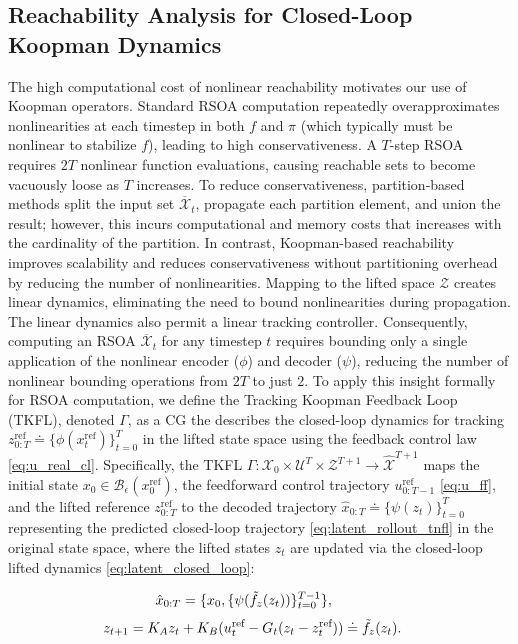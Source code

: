 \documentclass{l4dc2026}
\begin{document}
\subsection{Reachability Analysis for Closed-Loop Koopman Dynamics}\label{sec:reachability}
The high computational cost of nonlinear reachability motivates our use of Koopman operators. Standard RSOA computation repeatedly overapproximates nonlinearities at each timestep in both $f$ and $\pi$ (which typically must be nonlinear to stabilize $f$), leading to high conservativeness. A $T$-step RSOA requires $2T$ nonlinear function evaluations, causing reachable sets to become vacuously loose as $T$ increases. To reduce conservativeness, partition-based methods split the input set $\overline{\mathcal{X}}_t$, propagate each partition element, and union the result; however, this incurs computational and memory costs that increases with the cardinality of the partition. In contrast, Koopman-based reachability improves scalability and reduces conservativeness without partitioning overhead by reducing the number of nonlinearities. Mapping to the lifted space $\mathcal{Z}$ creates linear dynamics, eliminating the need to bound nonlinearities during propagation. The linear dynamics also permit a linear tracking controller. Consequently, computing an RSOA $\overline{\mathcal{X}}_t$ for any timestep $t$ requires bounding only a single application of the nonlinear encoder ($\phi$) and decoder ($\psi$), reducing the number of nonlinear bounding operations from $2T$ to just $2$. 
To apply this insight formally for RSOA computation, we define the Tracking Koopman Feedback Loop (TKFL), denoted $\Gamma$, as a CG the describes the closed-loop dynamics for tracking $z_{0:T}^{\text{ref}} \doteq \{\phi(x_t^{\text{ref}})\}_{t=0}^T$ in the lifted state space using the feedback control law \eqref{eq:u_real_cl}.  Specifically, the TKFL $\Gamma : \mathcal{X}_0 \times \mathcal{U}^T \times \mathcal{Z}^{T+1} \rightarrow \hat{\mathcal{X}}^{T+1}$ maps the initial state $x_0 \in \mathcal{B}_{\epsilon}(x_{0}^{\text{ref}})$, the feedforward control trajectory $u_{0:T-1}^{\text{ref}}$ \eqref{eq:u_ff}, and the lifted reference $z_{0:T}^{\text{ref}}$ to the decoded trajectory $\hat{x}_{0:T} \doteq \{\psi(z_{t})\}_{t=0}^T$ representing the predicted closed-loop trajectory \eqref{eq:latent_rollout_tnfl} in the original state space, where the lifted states $z_t$ are updated via the closed-loop lifted dynamics \eqref{eq:latent_closed_loop}: 

\begin{equation}
\label{eq:latent_rollout_tnfl}
    \hspace{-23pt}\hat{x}_{0:T} = \{x_0, \{\psi (\tilde f_z(z_t))\}_{t=0}^{T-1}\},
\end{equation}
\begin{equation}
\label{eq:latent_closed_loop}
    \hspace{-30pt} z_{t+1} = K_{A} z_t + K_{B} (u_t^\textrm{ref} - G_t(z_t - z_t^\textrm{ref})) \doteq \tilde f_z(z_t).\hspace{-20pt}
\end{equation}
\end{document}
